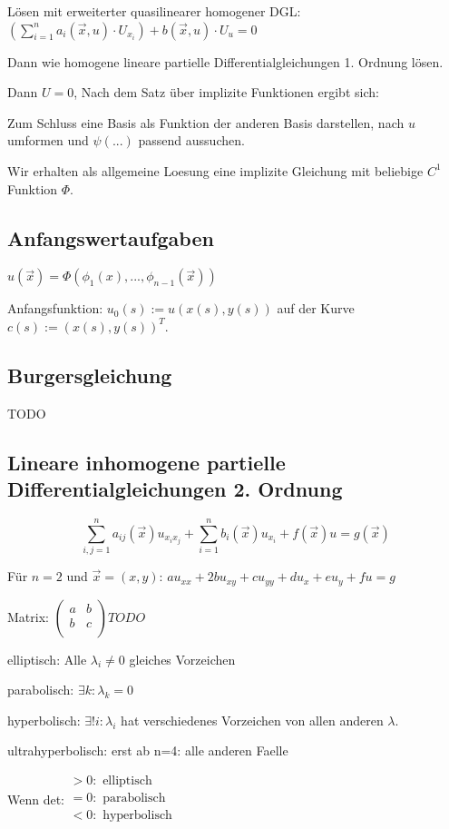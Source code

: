 \documentclass[10pt,a4paper]{article}
\begin{document}
Lösen mit erweiterter quasilinearer homogener DGL: $\left( \sum\limits_{i=1}^n a_i(\vec{x}, u)\cdot U_{x_i} \right) + b(\vec{x}, u)\cdot U_u = 0$

Dann wie homogene lineare partielle Differentialgleichungen 1. Ordnung lösen.

Dann $U = 0$, Nach dem Satz über implizite Funktionen ergibt sich:

Zum Schluss eine Basis als Funktion der anderen Basis darstellen, nach $u$ umformen und $\psi(...)$ passend aussuchen.

Wir erhalten als allgemeine Loesung eine implizite Gleichung mit beliebige $C^1$ Funktion $\Phi$.	

\subsection{Anfangswertaufgaben}
$u(\vec{x}) = \Phi(\phi_1({x}), ... , \phi_{n-1}(\vec{x}))$

Anfangsfunktion: $u_0(s) := u(x(s), y(s))$ auf der Kurve $c(s) := (x(s), y(s))^T$.

\subsection{Burgersgleichung}
TODO

\subsection{Lineare inhomogene partielle Differentialgleichungen 2. Ordnung}
\[
\sum\limits_{i,j=1}^n a_{ij}(\vec{x})u_{x_ix_j} + \sum\limits_{i=1}^n b_i(\vec{x}) u_{x_i} + f(\vec{x})u = g(\vec{x})
\]

Für $n=2$ und $\vec{x}=(x,y)$: $au_{xx} +2bu_{xy}+cu_{yy} + du_x+eu_y+fu=g$

Matrix: $
\left(
\begin{matrix}
a & b \\
b & c \\
\end{matrix}
\right)
TODO$

elliptisch: Alle $\lambda_i \neq 0$ gleiches Vorzeichen

parabolisch: $\exists k : \lambda_k = 0$

hyperbolisch: $\exists! i : \lambda_i$ hat verschiedenes Vorzeichen von allen anderen $\lambda$.

ultrahyperbolisch: erst ab n=4: alle anderen Faelle

Wenn det:$
\begin{matrix}
> 0: \mbox{ elliptisch\ \ \ \ \ } \\
= 0: \mbox{ parabolisch\ } \\
< 0: \mbox{ hyperbolisch} \\
\end{matrix}
$
\end{document}
